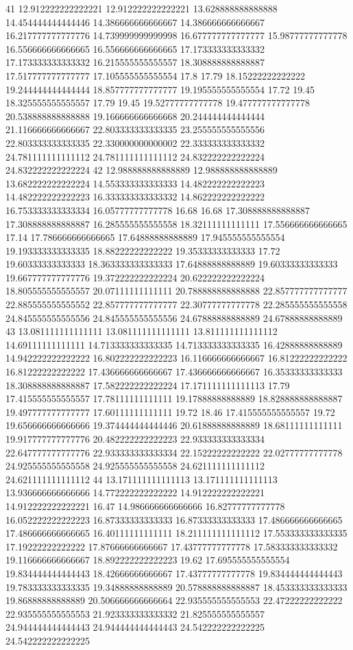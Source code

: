 41 12.912222222222221 12.912222222222221 13.628888888888888 14.454444444444446 14.386666666666667 14.386666666666667 16.217777777777776 14.739999999999998 16.677777777777777 15.98777777777778 16.556666666666665 16.556666666666665 17.173333333333332 17.173333333333332 16.215555555555557 18.308888888888887 17.517777777777777 17.105555555555554 17.8 17.79 18.15222222222222 19.244444444444444 18.857777777777777 19.195555555555554 17.72 19.45 18.325555555555557 17.79 19.45 19.52777777777778 19.477777777777778 20.538888888888888 19.166666666666668 20.244444444444444 21.116666666666667 22.803333333333335 23.255555555555556 22.803333333333335 22.330000000000002 22.333333333333332 24.781111111111112 24.781111111111112 24.832222222222224 24.832222222222224
42 12.988888888888889 12.988888888888889 13.682222222222224 14.553333333333333 14.482222222222223 14.482222222222223 16.333333333333332 14.862222222222222 16.753333333333334 16.05777777777778 16.68 16.68 17.308888888888887 17.308888888888887 16.285555555555558 18.32111111111111 17.556666666666665 17.14 17.786666666666665 17.64888888888889 17.945555555555554 19.193333333333335 18.88222222222222 19.35333333333333 17.72 19.60333333333333 18.363333333333333 17.64888888888889 19.60333333333333 19.667777777777776 19.372222222222224 20.622222222222224 18.805555555555557 20.07111111111111 20.788888888888888 22.857777777777777 22.885555555555552 22.857777777777777 22.30777777777778 22.285555555555558 24.845555555555556 24.845555555555556 24.67888888888889 24.67888888888889
43 13.081111111111111 13.081111111111111 13.811111111111112 14.69111111111111 14.713333333333335 14.713333333333335 16.42888888888889 14.942222222222222 16.802222222222223 16.116666666666667 16.81222222222222 16.81222222222222 17.436666666666667 17.436666666666667 16.35333333333333 18.308888888888887 17.582222222222224 17.171111111111113 17.79 17.415555555555557 17.78111111111111 19.17888888888889 18.828888888888887 19.497777777777777 17.60111111111111 19.72 18.46 17.415555555555557 19.72 19.656666666666666 19.374444444444446 20.61888888888889 18.68111111111111 19.917777777777776 20.482222222222223 22.933333333333334 22.647777777777776 22.933333333333334 22.15222222222222 22.02777777777778 24.925555555555558 24.925555555555558 24.621111111111112 24.621111111111112
44 13.171111111111113 13.171111111111113 13.936666666666666 14.772222222222222 14.912222222222221 14.912222222222221 16.47 14.986666666666666 16.82777777777778 16.052222222222223 16.87333333333333 16.87333333333333 17.486666666666665 17.486666666666665 16.40111111111111 18.211111111111112 17.553333333333335 17.19222222222222 17.87666666666667 17.43777777777778 17.583333333333332 19.116666666666667 18.892222222222223 19.62 17.695555555555554 19.834444444444443 18.42666666666667 17.43777777777778 19.834444444444443 19.783333333333335 19.34888888888889 20.578888888888887 18.453333333333333 19.86888888888889 20.506666666666664 22.935555555555553 22.47222222222222 22.935555555555553 21.923333333333332 21.825555555555557 24.944444444444443 24.944444444444443 24.542222222222225 24.542222222222225
